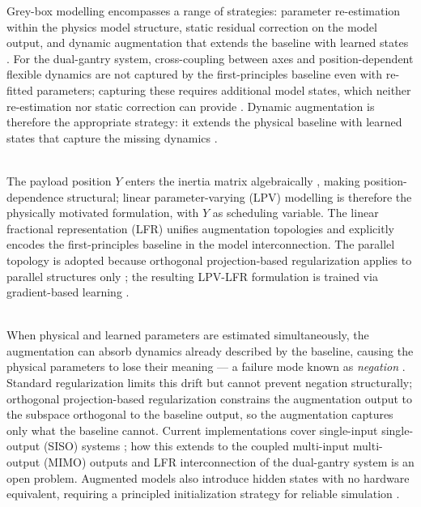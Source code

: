 
Grey-box modelling encompasses a range of strategies: parameter re-estimation within the physics model structure, static residual correction on the model output, and dynamic augmentation that extends the baseline with learned states \cite{willard2020integrating, noel2018greybox}.
For the dual-gantry system, cross-coupling between axes and position-dependent flexible dynamics are not captured by the first-principles baseline even with re-fitted parameters; capturing these requires additional model states, which neither re-estimation nor static correction can provide \cite{hoekstra2026lfr}.
Dynamic augmentation is therefore the appropriate strategy: it extends the physical baseline with learned states that capture the missing dynamics \cite{willard2020integrating, hoekstra2026lfr}.

\\

The payload position $Y$ enters the inertia matrix algebraically \cite{garcia2013model}, making position-dependence structural; linear parameter-varying (LPV) modelling \cite{toth2010lpv} is therefore the physically motivated formulation, with $Y$ as scheduling variable.
The linear fractional representation (LFR) \cite{hoekstra2026lfr} unifies augmentation topologies and explicitly encodes the first-principles baseline in the model interconnection.
The parallel topology is adopted because orthogonal projection-based regularization applies to parallel structures only \cite{gyorok2025l4dc}; the resulting LPV-LFR formulation is trained via gradient-based learning \cite{drenth2025lpvlfr}.

\\

When physical and learned parameters are estimated simultaneously, the augmentation can absorb dynamics already described by the baseline, causing the physical parameters to lose their meaning — a failure mode known as \emph{negation} \cite{kon2022physics, gyorok2025l4dc}.
Standard regularization limits this drift but cannot prevent negation structurally; orthogonal projection-based regularization \cite{kon2022physics, gyorok2025l4dc} constrains the augmentation output to the subspace orthogonal to the baseline output, so the augmentation captures only what the baseline cannot.
Current implementations cover single-input single-output (SISO) systems \cite{bolderman2024pgnn}; how this extends to the coupled multi-input multi-output (MIMO) outputs and LFR interconnection of the dual-gantry system is an open problem.
Augmented models also introduce hidden states with no hardware equivalent, requiring a principled initialization strategy for reliable simulation \cite{hoekstra2026encoder}.

